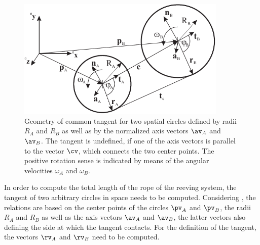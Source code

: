     \begin{figure}[tbph]
      \begin{center}
      \includegraphics[width=10cm]{figures/CommonTangents3D.pdf}
      \end{center}
      \caption{Geometry of common tangent for two spatial circles defined by radii $R_A$ and $R_B$ as well as by the 
      normalized axis vectors $\av_A$ and $\av_B$. The tangent is undefined, if one of the axis vectors is parallel to the 
      vector $\cv$, which connects the two center points. The positive rotation sense is indicated by means of the 
      angular velocities $\omega_A$ and $\omega_B$.}
    	\label{fig:ReevingSystemSprings:tangents}
    \end{figure}
    In order to compute the total length of the rope of the reeving system, the tangent of two arbitrary circles in space needs to be computed.
    Considering , the relations are based on the
    center points of the circles $\pv_A$ and $\pv_B$, the radii $R_A$ and $R_B$ as well as
    the axis vectors $\av_A$ and $\av_B$, the latter vectors also defining the side at which the tangent contacts.
    For the definition of the tangent, the vectors $\rv_A$ and $\rv_B$ need to be computed.
    
